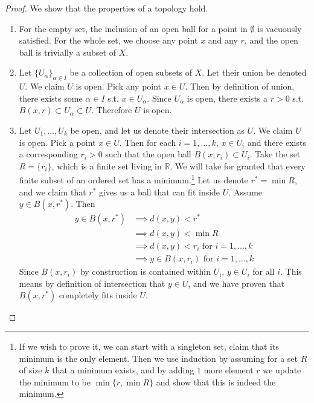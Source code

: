   \begin{proof}
    We show that the properties of a topology hold. 
    \begin{enumerate} 
      \item For the empty set, the inclusion of an open ball for a point in $\emptyset$ is vacuously satisfied. For the whole set, we choose any point $x$ and any $r$, and the open ball is trivially a subset of $X$. 

      \item Let $\{U_\alpha\}_{\alpha \in I}$ be a collection of open subsets of $X$. Let their union be denoted $U$. We claim $U$ is open. Pick any point $x \in U$. Then by definition of union, there exists some $\alpha \in I$ s.t. $x \in U_\alpha$. Since $U_\alpha$ is open, there exists a $r > 0$ s.t. $B(x, r) \subset U_\alpha \subset U$. Therefore $U$ is open. 

      \item Let $U_1, \ldots, U_k$ be open, and let us denote their intersection as $U$. We claim $U$ is open. Pick a point $x \in U$. Then for each $i = 1, \ldots, k$, $x \in U_i$ and there exists a corresponding $r_i > 0$  such that the open ball $B(x, r_i) \subset U_i$. Take the set $R = \{r_i\}$, which is a finite set living in $\mathbb{R}$. We will take for granted that every finite subset of an ordered set has a minimum.\footnote{If we wish to prove it, we can start with a singleton set, claim that its minimum is the only element. Then we use induction by assuming for a set $R$ of size $k$ that a minimum exists, and by adding $1$ more element $r$ we update the minimum to be $\min\{r, \min{R}\}$ and show that this is indeed the minimum.} Let us denote $r^\ast = \min{R}$, and we claim that $r^\ast$ gives us a ball that can fit inside $U$. Assume $y \in B(x, r^\ast)$. Then 
      \begin{align}
        y \in B(x, r^\ast) & \implies d(x, y) < r^\ast \\ 
                           & \implies d(x, y) < \min{R} \\
                           & \implies d(x, y) < r_i \text{ for } i = 1, \ldots, k \\
                           & \implies y \in B(x, r_i) \text{ for } i = 1, \ldots, k
      \end{align} 
      Since $B(x, r_i)$ by construction is contained within $U_i$, $y \in U_i$ for all $i$. This means by definition of intersection that $y \in U$, and we have proven that $B(x, r^\ast)$ completely fits inside $U$. 
    \end{enumerate}
  \end{proof} 

